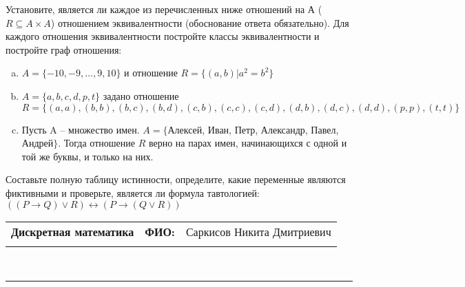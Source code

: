 \documentclass[10pt]{exam}
\newcommand{\class}{Дискретная математика}
\newcommand{\examdate}{}
\begin{document}
\begin{questions}
\question
Установите, является ли каждое из перечисленных ниже отношений на А ($R \subseteq A \times A$) отношением эквивалентности (обоснование ответа обязательно). Для каждого отношения эквивалентности постройте классы 
эквивалентности и постройте граф отношения:
\begin{enumerate} [a)]\setcounter{enumi}{0}
\item $A = \{-10, -9, … , 9, 10\}$ и отношение $R = \{(a,b)|a^{2} = b^{2}\}$
\item $A = \{a, b, c, d, p, t\}$ задано отношение $R = \{(a, a), (b, b), (b, c), (b, d), (c, b), (c, c), (c, d), (d, b), (d, c), (d, d), (p,p), (t,t)\}$
\item Пусть A – множество имен. $A = \{ $Алексей, Иван, Петр, Александр, Павел, Андрей$ \}$. Тогда отношение $R$ верно на парах имен, начинающихся с одной и той же буквы, и только на них.
\end{enumerate}\question Составьте полную таблицу истинности, определите, какие переменные являются фиктивными и проверьте, является ли формула тавтологией:
$((P \rightarrow Q) \lor R) \leftrightarrow (P \rightarrow (Q \lor R))$

\end{questions}
\newpage
\begin{flushright}
\begin{tabular}{p{2.8in} r l}
\textbf{\class} & \textbf{ФИО:} &Саркисов Никита Дмитриевич
\\

\textbf{\examdate} &&\\
\end{tabular}\\
\end{flushright}
\rule[1ex]{\textwidth}{.1pt}
\end{document}
